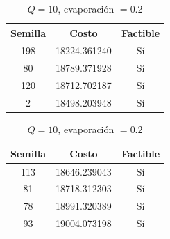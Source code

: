 \documentclass{article}
\begin{document}
    \begin{table}[H]
      \begin{minipage}{0.5\linewidth}
        \centering
        \caption{$Q=1$, evaporación $= 0.2$}
        \begin{tabular}{c c c}
          \hline
          Semilla & Costo & Factible \\
          \hline
          198     & 18224.361240 & Sí \\
          80      & 18789.371928 & Sí \\
          120     & 18712.702187 & Sí \\
          2       & 18498.203948 & Sí \\
        \end{tabular}
      \end{minipage}
      \begin{minipage}{0.5\linewidth}
        \centering
        \caption{$Q=10$, evaporación $= 0.2$}
        \begin{tabular}{c c c}
          \hline
          Semilla & Costo & Factible   \\
          \hline
          113     & 18646.239043 & Sí  \\
          81      & 18718.312303 & Sí  \\
          78      & 18991.320389 & Sí  \\
          93      & 19004.073198 & Sí  \\
        \end{tabular}
      \end{minipage}
    \end{table}
\end{document}

